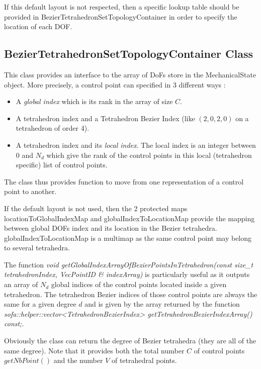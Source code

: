 \documentclass[a4paper,11pt]{article}
\newcommand{\ncontrols}{{C}}
\newcommand{\degree}{{d}}
\begin{document}
If this default layout is not respected, then a specific lookup table should be provided in
BezierTetrahedronSetTopologyContainer in order to specify the location of each DOF.

\subsection{BezierTetrahedronSetTopologyContainer Class}

This class provides an interface to the array of DoFs store in the MechanicalState object. More precisely, a control point can specified in 3 different ways :

\begin{itemize}
	\item A {\em global index} which is its rank in the array of size $\ncontrols$.
	\item A tetrahedron index and a Tetrahedron Bezier Index (like $(2,0,2,0)$ on a tetrahedron of order 4).
	\item A tetrahedron index and its {\em local index}. The local index is an integer between 0 and $N_\degree$ which give the rank of the control points in this local (tetrahedron specific) list of control points.
\end{itemize}

The class thus provides function to move from one representation of a control point to another.

If the default layout is not used, then the 2 protected maps locationToGlobalIndexMap and
globalIndexToLocationMap provide the mapping between global DOFs index and its location in
the Bezier tetrahedra. globalIndexToLocationMap is a multimap as the same control point
may belong to several tetrahedra.


The function {\it void getGlobalIndexArrayOfBezierPointsInTetrahedron(const size\_t tetrahedronIndex, VecPointID \& indexArray) } is particularly useful as it outputs an array of $N_\degree$ global indices of the control points located inside a given tetrahedron. The tetrahedron Bezier indices of those control points are always the same for a given degree $\degree$ and is given by the array returned by the function {\it sofa::helper::vector<TetrahedronBezierIndex> getTetrahedronBezierIndexArray() const;}.

Obviously the class can return the degree of  Bezier tetrahedra (they are all of the same degree). Note that it provides both the total number $\ncontrols$ of control points $getNbPoint()$ and the number $V$ of tetrahedral points.
\end{document}
